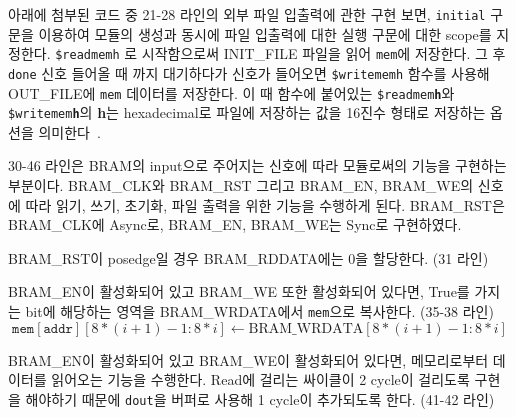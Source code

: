 \documentclass{article}
\begin{document}
\begin{itemize*}
\item 아래에 첨부된 코드 중 21-28 라인의 외부 파일 입출력에 관한 구현 보면, \texttt{initial} 구문을 이용하여 모듈의 생성과 동시에 파일 입출력에 대한 실행 구문에 대한 scope를 지정한다. 
\texttt{\$readmemh} 로 시작함으로써 INIT\_FILE 파일을 읽어 \texttt{mem}에 저장한다. 
그 후 \texttt{done} 신호 들어올 때 까지 대기하다가 신호가 들어오면 \texttt{\$writememh} 함수를 사용해 OUT\_FILE에 \texttt{mem} 데이터를 저장한다.
이 때 함수에 붙어있는 \texttt{\$readmem\textbf{h}}와 \texttt{\$writemem\textbf{h}}의 \textbf{h}는 hexadecimal로 파일에 저장하는 값을 16진수 형태로 저장하는 옵션을 의미한다~\cite{memh}. \\
\item 30-46 라인은 BRAM의 input으로 주어지는 신호에 따라 모듈로써의 기능을 구현하는 부분이다. BRAM\_CLK와 BRAM\_RST 그리고 BRAM\_EN, BRAM\_WE의 신호에 따라 읽기, 쓰기, 초기화, 파일 출력을 위한 기능을 수행하게 된다. BRAM\_RST은 BRAM\_CLK에 Async로, BRAM\_EN, BRAM\_WE는 Sync로 구현하였다.
\begin{itemize*}
\item BRAM\_RST이 posedge일 경우 BRAM\_RDDATA에는 0을 할당한다. (31 라인)
\item BRAM\_EN이 활성화되어 있고 BRAM\_WE 또한 활성화되어 있다면, True를 가지는 bit에 해당하는 영역을 BRAM\_WRDATA에서 \texttt{mem}으로 복사한다. (35-38 라인)
\begin{equation}
\texttt{mem}[ \texttt{addr} ][8*(i+1)-1:8* i ]  \leftarrow \text{BRAM\_WRDATA}[8*(i+1) -1:8* i ] 
\end{equation}
\item BRAM\_EN이 활성화되어 있고 BRAM\_WE이 활성화되어 있다면, 메모리로부터 데이터를 읽어오는 기능을 수행한다. Read에 걸리는 싸이클이 2 cycle이 걸리도록 구현을 해야하기 때문에 \texttt{dout}을 버퍼로 사용해 1 cycle이 추가되도록 한다. (41-42 라인)
\end{itemize*}
\end{itemize*}

\newpage
\end{document}
